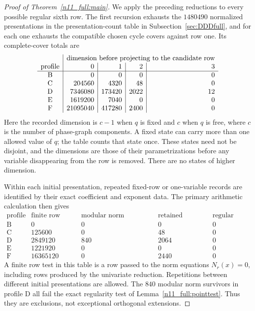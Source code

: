 \documentclass[11pt,a4paper]{article}
\theoremstyle{plain}
\theoremstyle{definition}
\theoremstyle{plain}
\begin{document}
\begin{proof}[Proof of Theorem~\ref{n11_full:main}]
We apply the preceding reductions to every possible regular sixth row. The first recursion exhausts the $1480490$ normalized presentations in the presentation-count table in Subsection~\ref{sec:DDDfull}, and for each one exhausts the compatible chosen cycle covers against row one. Its complete-cover totals are
\[
\begin{array}{c|r|r|r|r}
&\multicolumn{4}{c}{\text{dimension before projecting to the candidate row}}\\
\text{profile}&0&1&2&3\\\hline
\mathrm{B}&0&0&0&0\\
\mathrm{C}&204560&4320&48&0\\
\mathrm{D}&7346080&173420&2022&12\\
\mathrm{E}&1619200&7040&0&0\\
\mathrm{F}&21095040&417280&2400&0
\end{array}
\]
Here the recorded dimension is $c-1$ when $q$ is fixed and $c$ when $q$ is free, where $c$ is the number of phase-graph components. A fixed state can carry more than one allowed value of $q$; the table counts that state once. These states need not be disjoint, and the dimensions are those of their parametrizations before any variable disappearing from the row is removed. There are no states of higher dimension.

Within each initial presentation, repeated fixed-row or one-variable records are identified by their exact coefficient and exponent data. The primary arithmetic calculation then gives
$$\begin{array}{c|r|r|r|r}
\text{profile}&\text{finite row tests}&\text{modular norm survivors}&
\text{retained families}&\text{regular rows}\\\hline
\mathrm{B}&0&0&0&0\\
\mathrm{C}&125600&0&48&0\\
\mathrm{D}&2849120&840&2064&0\\
\mathrm{E}&1221920&0&0&0\\
\mathrm{F}&16365120&0&2440&0
\end{array}$$
A finite row test in this table is a row passed to the norm equations $N_r(x)=0$, including rows produced by the univariate reduction. Repetitions between different initial presentations are allowed. The $840$ modular norm survivors in profile $\mathrm{D}$ all fail the exact regularity test of Lemma~\ref{n11_full:pointtest}. Thus they are exclusions, not exceptional orthogonal extensions.


\end{proof}
\end{document}
